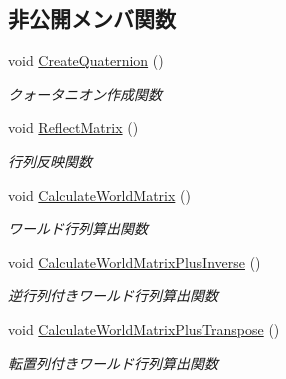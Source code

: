 \subsection*{非公開メンバ関数}
\begin{DoxyCompactItemize}
\item 
void \mbox{\hyperlink{class_transform_a7884cb828ace5c921e7138d83c43d689}{Create\+Quaternion}} ()
\begin{DoxyCompactList}\small\item\em クォータニオン作成関数 \end{DoxyCompactList}\item 
void \mbox{\hyperlink{class_transform_aaf47943b2583b4cb31a54881b5ef8eca}{Reflect\+Matrix}} ()
\begin{DoxyCompactList}\small\item\em 行列反映関数 \end{DoxyCompactList}\item 
void \mbox{\hyperlink{class_transform_a2f5c4e0e8a7aae115f37a2cdd0a745d7}{Calculate\+World\+Matrix}} ()
\begin{DoxyCompactList}\small\item\em ワールド行列算出関数 \end{DoxyCompactList}\item 
void \mbox{\hyperlink{class_transform_ab12dc73e0dcce2bc8e7129f0affe2775}{Calculate\+World\+Matrix\+Plus\+Inverse}} ()
\begin{DoxyCompactList}\small\item\em 逆行列付きワールド行列算出関数 \end{DoxyCompactList}\item 
void \mbox{\hyperlink{class_transform_a2f7413dc6aa2d071de0c5842e5351acd}{Calculate\+World\+Matrix\+Plus\+Transpose}} ()
\begin{DoxyCompactList}\small\item\em 転置列付きワールド行列算出関数 \end{DoxyCompactList}\end{DoxyCompactItemize}

